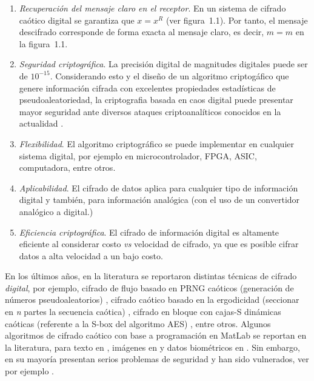\begin{enumerate}
\item \textit{Recuperación del mensaje claro en el receptor}. En un sistema de cifrado caótico digital se garantiza que $x = x^{R}$ (ver figura~1.1). Por tanto, el mensaje descifrado corresponde de forma exacta al mensaje claro, es decir, $\widehat{m} = m$ en la figura~1.1. 
\item  \textit{Seguridad criptográfica}. La precisión digital de magnitudes digitales puede ser de $10^{-15}$. Considerando esto y el diseño de un algoritmo criptogáfico que genere información cifrada con excelentes propiedades estadísticas de pseudoaleatoriedad, la criptografia basada en caos digital puede presentar mayor seguridad ante diversos ataques criptoanalíticos conocidos en la actualidad \cite{YyH_2010, AEtAl_2012, FEtAl_2013, B_1998, WyT_2012, AyJ_2007, HEtAl_2014, ZEtAl_2014a, MyM_2012, PEtAl_2006, PEtAl_2009, HyX_2010, C_2010, CyC_2011, WEtAl_2012, L_2012, IyC_2013, NEtAl_2014, KEtAl_2007, XEtAl_2011}.  
\item \textit{Flexibilidad}. El algoritmo criptográfico se puede implementar en cualquier sistema digital, por ejemplo en microcontrolador, FPGA, ASIC, computadora, entre otros.
\item \textit{Aplicabilidad}. El cifrado de datos aplica para cualquier tipo de información digital y también, para información analógica (con el uso de un convertidor analógico a digital.)
\item \textit{Eficiencia criptográfica}. El cifrado de información digital es altamente eficiente al considerar costo \textit{vs} velocidad de cifrado, ya que es posible cifrar datos a alta velocidad a un bajo costo.
\end{enumerate}

En los últimos años, en la literatura se reportaron distintas técnicas de cifrado \textit{digital}, por ejemplo, cifrado de flujo basado en PRNG caóticos (generación de números pseudoaleatorios) \cite{YyH_2010, AEtAl_2012, FEtAl_2013}, cifrado caótico basado en la ergodicidad (seccionar en \textit{n} partes la secuencia caótica) \cite{B_1998, WyT_2012}, cifrado en bloque con cajas-S dinámicas caóticas (referente a la S-box del algoritmo AES) \cite{AyJ_2007, HEtAl_2014, ZEtAl_2014a}, entre otros. Algunos algoritmos de cifrado caótico con base a programación en MatLab se reportan en la literatura, para texto en \cite{MyM_2012}, imágenes en \cite{PEtAl_2006, PEtAl_2009, HyX_2010, C_2010, CyC_2011, WEtAl_2012, L_2012, IyC_2013, NEtAl_2014} y datos biométricos en \cite{KEtAl_2007, XEtAl_2011}. Sin embargo, en su mayoría presentan serios problemas de seguridad y han sido vulnerados, ver por ejemplo \cite{WEtAl_2005, WEtAl_2007, ByN_2008, CyS_2009, AyL_2009, LEtAl_2009, REtAl_2010, SEtAl_2010, LEtAl_2011, ZEtAl_2011, LEtAl_2012}.  \\

